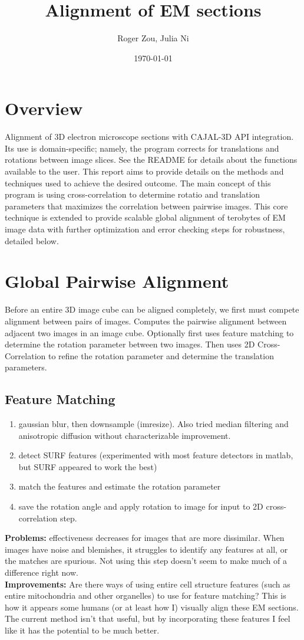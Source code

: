\documentclass{article}
\author{Roger Zou, Julia Ni}
\date{\today}
\title{Alignment of EM sections}
\begin{document}
  
\maketitle

\section{Overview}
Alignment of 3D electron microscope sections with CAJAL-3D API integration. Its use is domain-specific; namely, the program corrects for translations and rotations between image slices.  See the README for details about the functions available to the user. This report aims to provide details on the methods and techniques used to achieve the desired outcome. The main concept of this program is using cross-correlation to determine rotatio and translation parameters that maximizes the correlation between pairwise images. This core technique is extended to provide scalable global alignment of terobytes of EM image data with further optimization and error checking steps for robustness, detailed below.

\section{Global Pairwise Alignment}
Before an entire 3D image cube can be aligned completely, we first must compete alignment between pairs of images. 
Computes the pairwise alignment between adjacent two images in an image cube. Optionally first uses feature matching to determine the rotation parameter between two images. Then uses 2D Cross-Correlation to refine the rotation parameter and determine the translation parameters.

\subsection{Feature Matching}
\begin{enumerate}
\item gaussian blur, then downsample (imresize). Also tried median filtering and anisotropic diffusion without characterizable improvement.
\item detect SURF features (experimented with most feature detectors in matlab, but SURF appeared to work the best)
\item match the features and estimate the rotation parameter
\item save the rotation angle and apply rotation to image for input to 2D cross-correlation step.
\end{enumerate}
\textbf{Problems:} effectiveness decreases for images that are more dissimilar. When images have noise and blemishes, it struggles to identify any features at all, or the matches are spurious. Not using this step doesn't seem to make much of a difference right now. \\
\textbf{Improvements:} Are there ways of using entire cell structure features (such as entire mitochondria and other organelles) to use for feature matching? This is how it appears some humans (or at least how I) visually align these EM sections. The current method isn't that useful, but by incorporating these features I feel like it has the potential to be much better.
\end{document}
